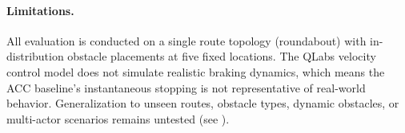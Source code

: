 \paragraph{Limitations.}
All evaluation is conducted on a single route topology (roundabout) with in-distribution obstacle placements at five fixed locations. The QLabs velocity control model does not simulate realistic braking dynamics, which means the ACC baseline's instantaneous stopping is not representative of real-world behavior. Generalization to unseen routes, obstacle types, dynamic obstacles, or multi-actor scenarios remains untested (see ).
